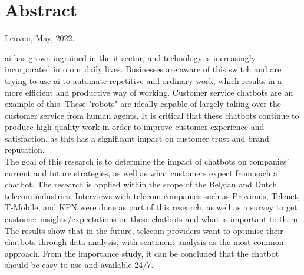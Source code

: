 \chapter*{Abstract\hfill} 
\label{ch:abstract}
\begin{flushright}
	Leuven, May, 2022.
\end{flushright}
\acrfull{ai} has grown ingrained in the \acrshort{it} sector, and technology is increasingly incorporated into our daily lives. Businesses are aware of this switch and are trying to use \acrshort{ai} to automate repetitive and ordinary work, which results in a more efficient and productive way of working. Customer service chatbots are an example of this. These "robots" are ideally capable of largely taking over the customer service from human agents. It is critical that these chatbots continue to produce high-quality work in order to improve customer experience and satisfaction, as this has a significant impact on customer trust and brand reputation.\\
\break
The goal of this research is to determine the impact of chatbots on companies' current and future strategies, as well as what customers expect from such a chatbot. The research is applied within the scope of the Belgian and Dutch telecom industries. Interviews with telecom companies such as Proximus, Telenet, T-Mobile, and KPN were done as part of this research, as well as a survey to get customer insights/expectations on these chatbots and what is important to them.\\
\break
The results show that in the future, telecom providers want to optimise their chatbots through data analysis, with sentiment analysis as the most common approach. From the importance study, it can be concluded that the chatbot should be easy to use and available 24/7.